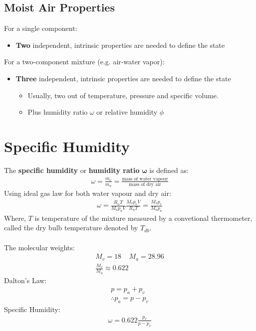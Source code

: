 \documentclass[class=report, crop=false, 12pt,a4paper]{standalone}
\numberwithin{equation}{section}
\begin{document}
\subsection{Moist Air Properties}
For a single component:
\begin{itemize}[noitemsep]
  \item \textbf{Two} independent, intrinsic properties are needed to define the state
\end{itemize}
For a two-component mixture (e.g. air-water vapor):
\begin{itemize}[noitemsep]
  \item \textbf{Three} independent, intrinsic properties are needed to define the state
  \begin{itemize}[noitemsep]
    \item Usually, two out of temperature, pressure
    and specific volume.
    \item Plus humidity ratio $\omega$ or relative humidity $\phi$ 
  \end{itemize}
\end{itemize}
\section{Specific Humidity}
The \textbf{specific humidity} or \textbf{humidity ratio} $\mathbf{\omega}$ is defined as:
\begin{gather}
  \omega = \frac{m_v}{m_a} = \frac{\text{mass of water vapour}}{\text{mass of dry air}}
\end{gather}
Using ideal gas law for both water vapour and dry air:
\begin{gather}
  \omega = \frac{R_u T}{M_a p_a V}\frac{M_v p_v V}{R_u T} = \frac{M_v p_v}{M_a p_a}
\end{gather}
Where, $T$ is temperature of the mixture measured by a convetional thermometer, called the dry bulb temperature denoted by $T_{db}$. \\\\
The molecular weights:
\begin{gather}
  M_v = 18 \ \ \ \ \ M_a = 28.96 \\[5pt]
  \frac{M_v}{M_a} \approx 0.622
\end{gather}
Dalton’s Law:
\begin{gather}
  p = p_a + p_v \\[5pt]
  \therefore p_a = p - p_v
\end{gather}
Specific Humidity:
\begin{gather}
  \omega = 0.622\frac{p_v}{p-p_v}
\end{gather}
\end{document}
